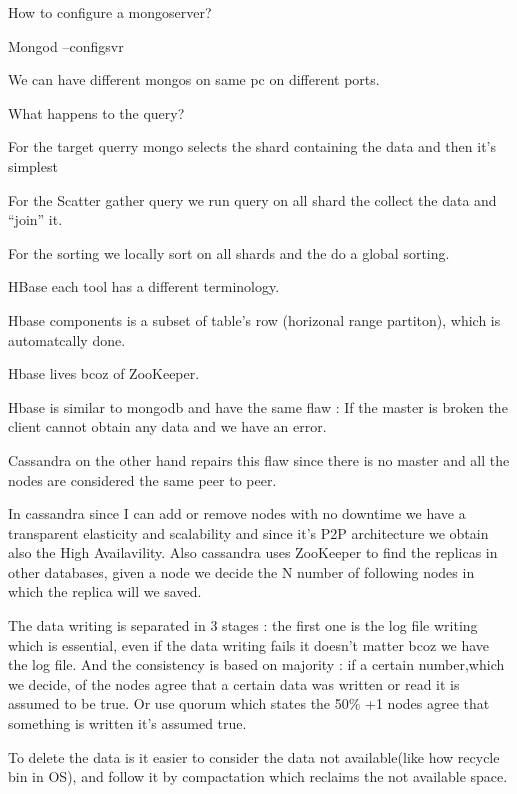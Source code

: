 \documentclass[a4page, 11pt]{article}
\begin{document}
How to configure a mongoserver?

Mongod --configsvr

We can have different mongos on same pc on different ports.

What happens to the query?

For the target querry mongo selects the shard containing the data and then it's simplest

For the Scatter gather query we run query on all shard the collect the data and ``join'' it.

For the sorting we locally sort on all shards and the do a global sorting.

HBase each tool has a different terminology.

Hbase components is a subset of table's row (horizonal range partiton), which is automatcally done.

Hbase lives bcoz of ZooKeeper.

Hbase is similar to mongodb and have the same flaw : If the master is broken the client cannot obtain any data and we have an error.

Cassandra on the other hand repairs this flaw since there is no master and all the nodes are considered the same peer to peer.

In cassandra since I can add or remove nodes with no downtime we have a transparent elasticity and scalability and since it's P2P architecture we obtain also the High Availavility. 
Also cassandra uses ZooKeeper to find the replicas in other databases, given a node we decide the N number of following nodes in which the replica will we saved.

The data writing is separated in 3 stages : the first one is the log file writing which is essential, even if the data writing fails it doesn't matter bcoz we have the log file. 
And the consistency is based
on majority : if a certain number,which we decide, of the nodes agree that a certain data was written or read it is assumed to be true. 
Or use quorum which states the 50\% +1 nodes agree that something is written it's assumed true.

To delete the data is it easier to consider the data not available(like how recycle bin in OS), and follow it by compactation which reclaims the not available space.
\end{document}
